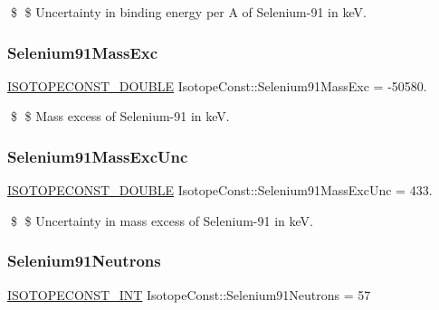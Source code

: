 \$ \$ Uncertainty in binding energy per A of Selenium-\/91 in keV. \mbox{\label{group___isotope_const-_selenium-_se91_ga5e61faf6119540799674397265cfe62d}} 
\subsubsection{\texorpdfstring{Selenium91\+Mass\+Exc}{Selenium91MassExc}}
{\footnotesize\ttfamily \mbox{\hyperlink{group___isotope_const-_macros_ga8f45a7272ce02c0b4c65c44636ed719a}{I\+S\+O\+T\+O\+P\+E\+C\+O\+N\+S\+T\+\_\+\+D\+O\+U\+B\+LE}} Isotope\+Const\+::\+Selenium91\+Mass\+Exc = -\/50580.}

\$ \$ Mass excess of Selenium-\/91 in keV. \mbox{\label{group___isotope_const-_selenium-_se91_ga9c77586e3008dcaa1fc6c2172e4285a4}} 
\subsubsection{\texorpdfstring{Selenium91\+Mass\+Exc\+Unc}{Selenium91MassExcUnc}}
{\footnotesize\ttfamily \mbox{\hyperlink{group___isotope_const-_macros_ga8f45a7272ce02c0b4c65c44636ed719a}{I\+S\+O\+T\+O\+P\+E\+C\+O\+N\+S\+T\+\_\+\+D\+O\+U\+B\+LE}} Isotope\+Const\+::\+Selenium91\+Mass\+Exc\+Unc = 433.}

\$ \$ Uncertainty in mass excess of Selenium-\/91 in keV. \mbox{\label{group___isotope_const-_selenium-_se91_ga95e8eee414bb94d27e5e46e9c879ec36}} 
\subsubsection{\texorpdfstring{Selenium91\+Neutrons}{Selenium91Neutrons}}
{\footnotesize\ttfamily \mbox{\hyperlink{group___isotope_const-_macros_ga5f18360b3e99483a35c32d789e62621c}{I\+S\+O\+T\+O\+P\+E\+C\+O\+N\+S\+T\+\_\+\+I\+NT}} Isotope\+Const\+::\+Selenium91\+Neutrons = 57}


